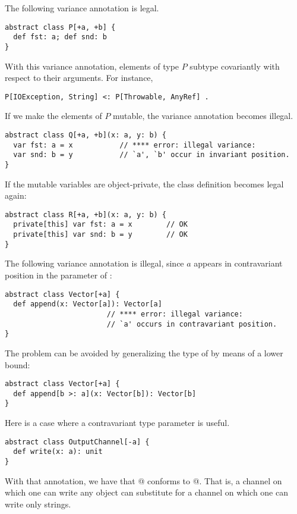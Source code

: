 \example The following variance annotation is legal. 
\begin{lstlisting}
abstract class P[+a, +b] {
  def fst: a; def snd: b
}
\end{lstlisting}
With this variance annotation, elements
of type $P$ subtype covariantly with respect to their arguments. 
For instance, 
\begin{lstlisting}
P[IOException, String] <: P[Throwable, AnyRef] .
\end{lstlisting}

If we make the elements of $P$ mutable, 
the variance annotation becomes illegal. 
\begin{lstlisting}
abstract class Q[+a, +b](x: a, y: b) { 
  var fst: a = x           // **** error: illegal variance:
  var snd: b = y           // `a', `b' occur in invariant position.
}
\end{lstlisting}
If the mutable variables are object-private, the class definition
becomes legal again:
\begin{lstlisting}
abstract class R[+a, +b](x: a, y: b) { 
  private[this] var fst: a = x        // OK
  private[this] var snd: b = y        // OK
}
\end{lstlisting}

\example The following variance annotation is illegal, since $a$ appears
in contravariant position in the parameter of :

\begin{lstlisting}
abstract class Vector[+a] {
  def append(x: Vector[a]): Vector[a]  
                        // **** error: illegal variance: 
                        // `a' occurs in contravariant position.
}
\end{lstlisting} 
The problem can be avoided by generalizing the type of 
by means of a lower bound:

\begin{lstlisting}
abstract class Vector[+a] {
  def append[b >: a](x: Vector[b]): Vector[b] 
}
\end{lstlisting}

\example Here is a case where a contravariant type parameter is useful.

\begin{lstlisting}
abstract class OutputChannel[-a] {
  def write(x: a): unit
}
\end{lstlisting}
With that annotation, we have that
\lstinline@OutputChannel[AnyRef]@ conforms to \lstinline@OutputChannel[String]@.  
That is, a
channel on which one can write any object can substitute for a channel
on which one can write only strings.

